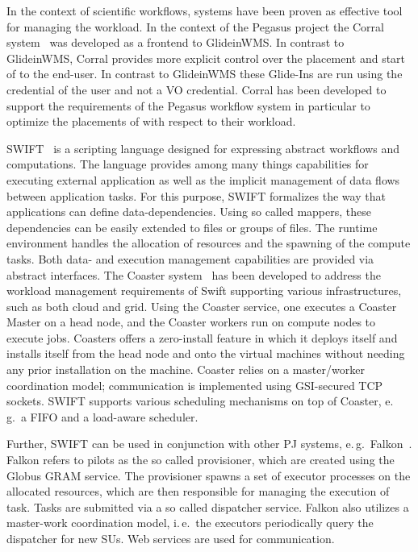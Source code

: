 \documentclass{sig-alternate}
\begin{document}
In the context of scientific workflows, \pilotjob systems have been
proven as effective tool for managing the workload. In the context of
the Pegasus project the Corral
system~\cite{Rynge:2011:EUG:2116259.2116599} was developed as a
frontend to GlideinWMS. In contrast to GlideinWMS, Corral provides
more explicit control over the placement and start of \pilots to the
end-user. In contrast to GlideinWMS these Glide-Ins are run using the credential of the user and
not a VO credential. Corral has been developed to support the
requirements of the Pegasus workflow system in particular to optimize
the placements of \pilots with respect to their workload.

SWIFT~\cite{Wilde2011} is a scripting language designed for expressing
abstract workflows and computations. The language provides among many
things capabilities for executing external application as well as the
implicit management of data flows between application tasks. For this
purpose, SWIFT formalizes the way that applications can define
data-dependencies. Using so called mappers, these dependencies can be
easily extended to files or groups of files. The runtime environment
handles the allocation of resources and the spawning of the compute
tasks. Both data- and execution management capabilities are provided
via abstract interfaces. The Coaster system~\cite{coasters} has been
developed to address the workload management requirements of Swift
supporting various infrastructures, such as both cloud and grid. Using
the Coaster service, one executes a Coaster Master on a head node, and
the Coaster workers run on compute nodes to execute jobs.  Coasters
offers a zero-install feature in which it deploys itself and installs
itself from the head node and onto the virtual machines without
needing any prior installation on the machine. Coaster relies on a
master/worker coordination model; communication is implemented using
GSI-secured TCP sockets. SWIFT supports various scheduling mechanisms
on top of Coaster, e.\,g.\ a FIFO and a load-aware scheduler.

Further, SWIFT can be used in conjunction with other PJ systems, e.\,g.\
Falkon~\cite{1362680}. Falkon refers to pilots as the so called provisioner,
which are created using the Globus GRAM service. The provisioner spawns a set
of executor processes on the allocated resources, which are then responsible
for managing the execution of task. Tasks are submitted via a so called
dispatcher service. Falkon also utilizes a master-work coordination
model, i.\,e.\ the executors periodically query the dispatcher for new SUs.
Web services are used for communication.
\end{document}
